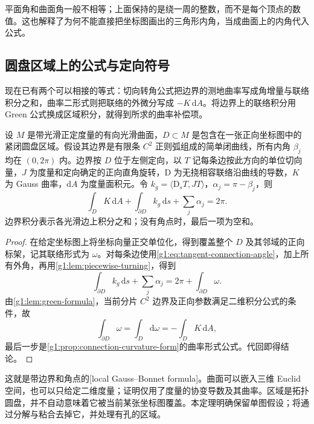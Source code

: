平面角和曲面角一般不相等；上面保持的是绕一周的整数，而不是每个顶点的数值。这也解释了为何不能直接把坐标图画出的三角形内角，当成曲面上的内角代入公式。

\subsection{圆盘区域上的公式与定向符号}
\label{g1:subsec:0903:03}

现在已有两个可以相接的等式：切向转角公式把边界的测地曲率写成角增量与联络积分之和，曲率二形式则把联络的外微分写成 \(-K\,\mathrm{d}A\)。将边界上的联络积分用 Green 公式换成区域积分，就得到所求的曲率补偿项。

\begin{theorem}
	\label{g1:thm:local-gauss-bonnet}
	设 \(M\) 是带光滑正定度量的有向光滑曲面，\(D\subset M\) 是包含在一张正向坐标图中的紧闭圆盘区域。假设其边界是有限条 \(C^2\) 正则弧组成的简单闭曲线，所有内角 \(\beta_j\) 均在 \((0,2\pi)\) 内。边界按 \(D\) 位于左侧定向，以 \(T\) 记每条边按此方向的单位切向量，\(J\) 为度量和定向确定的正向直角旋转，\(\mathrm D\) 为无挠相容联络沿曲线的导数，\(K\) 为 Gauss 曲率，\(\mathrm dA\) 为度量面积元。令 \(k_g=\langle \mathrm{D}_sT,JT\rangle\)，\(\alpha_j=\pi-\beta_j\)，则
	\begin{equation}
		\label{g1:eq:local-gauss-bonnet}
		\int_D K\,\mathrm{d}A
		+\int_{\partial D}k_g\,\mathrm{d}s
		+\sum_j\alpha_j=2\pi.
	\end{equation}
	边界积分表示各光滑边上积分之和；没有角点时，最后一项为空和。
\end{theorem}
\begin{proof}
	在给定坐标图上将坐标向量正交单位化，得到覆盖整个 \(D\) 及其邻域的正向标架，记其联络形式为 \(\omega\)。对每条边使用\eqref{g1:eq:tangent-connection-angle}，加上所有外角，再用\cref{g1:lem:piecewise-turning}，得到
	\[
		\int_{\partial D}k_g\,\mathrm{d}s+\sum_j\alpha_j
		=2\pi+\int_{\partial D}\omega.
	\]
	由\cref{g1:lem:green-formula}，当前分片 \(C^2\) 边界及正向参数满足二维积分公式的条件，故
	\[
		\int_{\partial D}\omega=\int_D\mathrm{d}\omega
		=-\int_D K\,\mathrm{d}A,
	\]
	最后一步是\cref{g1:prop:connection-curvature-form}的曲率形式公式。代回即得结论。
\end{proof}

这就是带边界和角点的[local Gauss--Bonnet formula]。曲面可以嵌入三维 Euclid 空间，也可以只给定二维度量；证明仅用了度量的协变导数及其曲率。区域是拓扑圆盘，并不自动意味着它被当前某张坐标图覆盖。本定理明确保留单图假设；将通过分解与粘合去掉它，并处理有孔的区域。

